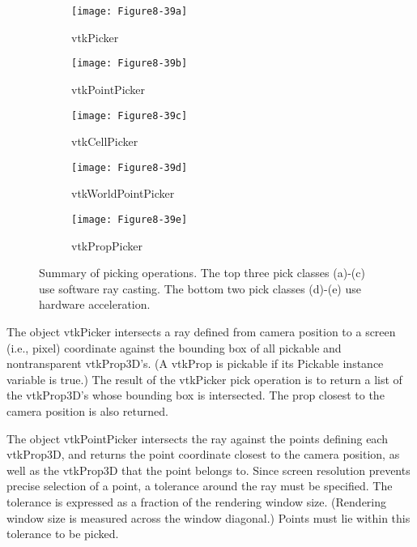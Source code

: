 \begin{figure}[!htb]
    \centering
    \begin{subfigure}{0.32\linewidth}
        \centering
        \texttt{[image: Figure8-39a]}
        \caption{vtkPicker}\label{fig:Figure8-39a}
    \end{subfigure}
    \hfill
    \begin{subfigure}{0.32\linewidth}
        \centering
        \texttt{[image: Figure8-39b]}
        \caption{vtkPointPicker}\label{fig:Figure8-39b}
    \end{subfigure}%
    \hfill
    \begin{subfigure}{0.32\linewidth}
        \centering
        \texttt{[image: Figure8-39c]}
        \caption{vtkCellPicker}\label{fig:Figure8-39c}
    \end{subfigure}%
    \hfill
    \begin{subfigure}{0.48\linewidth}
        \centering
        \texttt{[image: Figure8-39d]}
        \caption{vtkWorldPointPicker}\label{fig:Figure8-39d}
    \end{subfigure}%
    \hfill
    \begin{subfigure}{0.48\linewidth}
        \centering
        \texttt{[image: Figure8-39e]}
        \caption{vtkPropPicker}\label{fig:Figure8-39e}
    \end{subfigure}%
    \caption{Summary of picking operations. The top three pick classes (a)-(c) use software ray casting. The bottom two pick classes (d)-(e) use hardware acceleration.}
    \label{fig:Figure8-39}
\end{figure}

The object vtkPicker intersects a ray defined from camera position to a screen (i.e., pixel) coordinate against the bounding box of all pickable and nontransparent vtkProp3D's. (A vtkProp is pickable if its Pickable instance variable is true.) The result of the vtkPicker pick operation is to return a list of the vtkProp3D's whose bounding box is intersected. The prop closest to the camera position is also returned.

The object vtkPointPicker intersects the ray against the points defining each vtkProp3D, and returns the point coordinate closest to the camera position, as well as the vtkProp3D that the point belongs to. Since screen resolution prevents precise selection of a point, a tolerance around the ray must be specified. The tolerance is expressed as a fraction of the rendering window size. (Rendering window size is measured across the window diagonal.) Points must lie within this tolerance to be picked.

